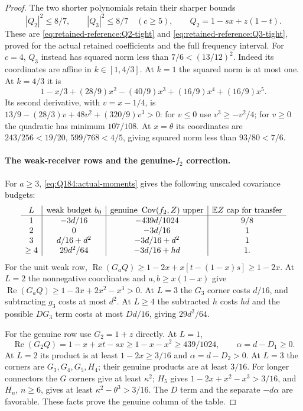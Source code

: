 \begin{proof}
The two shorter polynomials retain their sharper bounds
\begin{equation}\label{eq:Q184:tight-short-inputs}
 |Q_2|^2\le8/7,\qquad |Q_3|^2\le8/7\quad(c\ge5),
 \qquad Q_2=1-sx+z(1-t).
\end{equation}
These are \eqref{eq:retained-reference:Q2-tight} and
\eqref{eq:retained-reference:Q3-tight}, proved for the actual retained
coefficients and the full frequency interval. For $c=4$, $Q_3$ instead
has squared norm less than $7/6<(13/12)^2$.
Indeed its coordinates are affine in $k\in[1,4/3]$.
At $k=1$ the squared norm is at most one. At $k=4/3$ it is
\[
 1-x/3+(28/9)x^2-(40/9)x^3+(16/9)x^4+(16/9)x^5.
\]
Its second derivative, with $v=x-1/4$, is
$13/9-(28/3)v+48v^2+(320/9)v^3>0$:
for $v\le0$ use $v^3\ge-v^2/4$; for $v\ge0$ the quadratic
has minimum $107/108$. At $x=\theta$ its coordinates are
$243/256<19/20$, $599/768<4/5$, giving squared norm
less than $93/80<7/6$.

\paragraph{The weak-receiver rows and the genuine-$f_2$ correction.}
For $a\ge3$, \eqref{eq:Q184:actual-moments} gives the following
unscaled covariance budgets:
\begin{equation}\label{eq:Q184:covariance-budgets}
\begin{array}{c|c|c|c}
 L&\text{weak budget }b_0&\text{genuine }\operatorname{Cov}(f_2,Z)\text{ upper}
    &\mathbb E Z\text{ cap for transfer}\\\hline
 1&-3d/16&-439d/1024&9/8\\
 2&0&-3d/16&1\\
 3&d/16+d^2&-3d/16+d^2&1\\
 \ge4&29d^2/64&-3d/16+hd&1.
\end{array}
\end{equation}
For the unit weak row,
$\operatorname{Re}(G_aQ)\ge1-2x+x[t-(1-x)s]\ge1-2x$.
At $L=2$ the nonnegative coordinates and $a,b\ge x(1-x)$ give
$\operatorname{Re}(G_aQ)\ge1-3x+2x^2-x^3>0$.
At $L=3$ the $G_3$ corner costs $d/16$, and subtracting $g_3$ costs
at most $d^2$. At $L\ge4$ the subtracted $h$ costs $hd$ and
the possible $DG_3$ term costs at most $Dd/16$, giving $29d^2/64$.

For the genuine row use $G_2=1+z$ directly. At $L=1$,
\[
 \operatorname{Re}(G_2Q)=1-x+xt-sx
 \ge1-x-x^2\ge439/1024,\qquad \alpha=d-D_1\ge0.
\]
At $L=2$ its product is at least $1-2x\ge3/16$ and
$\alpha=d-D_2>0$.
At $L=3$ the corners are $G_3,G_4,G_5,H_4$; their genuine
products are at least $3/16$.
For longer connectors the $G$ corners give at least $\kappa^2$;
$H_5$ gives $1-2x+x^2-x^3>3/16$, and $H_n$, $n\ge6$, gives
at least $\kappa^2-\theta^3>3/16$.
The $D$ term and the separate $-d\alpha$ are favorable.
These facts prove the genuine column of the table.


\end{proof}
